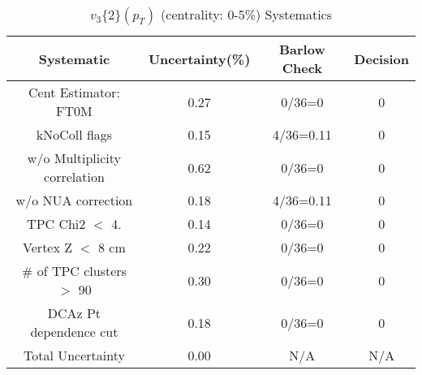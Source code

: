 \begin{table}[htbp]
\caption{$v_3\{2\}(p_{T})$ (centrality: 0-5\%) Systematics}
\label{tab:Sys_pTDiffv3}
\centering
\begin{tabular}{|c|c|c|c|}
\hline
Systematic & Uncertainty(\%) & Barlow Check & Decision \\
\hline
Cent Estimator: FT0M & 0.27 & 0/36=0 & 0 \\
kNoColl flags & 0.15 & 4/36=0.11 & 0 \\
w/o Multiplicity correlation & 0.62 & 0/36=0 & 0 \\
w/o NUA correction & 0.18 & 4/36=0.11 & 0 \\
TPC Chi2 $<$ 4. & 0.14 & 0/36=0 & 0 \\
Vertex Z $<$ 8 cm & 0.22 & 0/36=0 & 0 \\
\# of TPC clusters $>$ 90 & 0.30 & 0/36=0 & 0 \\
DCAz Pt dependence cut & 0.18 & 0/36=0 & 0 \\
\hline
Total Uncertainty & 0.00 & N/A & N/A \\
\hline
\end{tabular}
\end{table}
